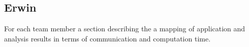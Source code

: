 \documentclass[final]{article}
\begin{document}
\subsection{Erwin}
For each team member a section describing the a mapping of application and analysis results in terms of communication and computation time.
\end{document}
